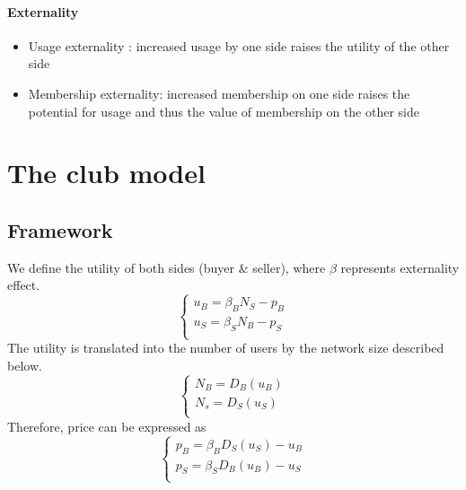 \paragraph{Externality}
\begin{itemize}
    \item Usage externality : increased usage by one side raises the utility of the other side 
    \item Membership externality: increased membership on one side raises the potential for usage and thus the value of membership on the other side
\end{itemize}

\section{The club model}
\subsection{Framework}
We define the utility of both sides (buyer \& seller), where $\beta$ represents externality effect.
\begin{equation*}
\begin{cases}
    u_B=\beta_B N_S-p_B\\
    u_S=\beta_S N_B-p_S\\
\end{cases}
\end{equation*}
The utility is translated into the number of users by the network size described below.
\begin{equation*}
    \begin{cases}
        N_B=D_B(u_B)\\
        N_s=D_S(u_S)\\
    \end{cases}
\end{equation*}
Therefore, price can be expressed as 
\begin{equation*}
    \begin{cases}
        p_B=\beta_B D_S(u_S)-u_B\\
        p_S=\beta_S D_B(u_B)-u_S\\
    \end{cases}
\end{equation*}
